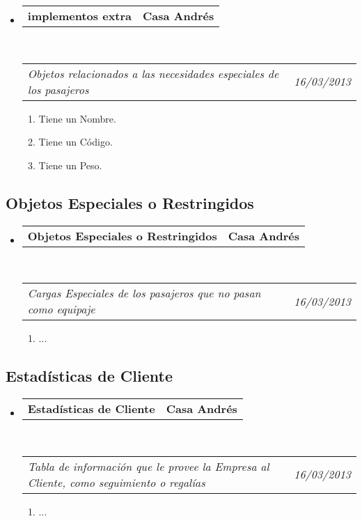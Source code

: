 \documentclass[10pt,letterpaper]{article}
\makeatletter
\newcommand{\headerrow}[2]
{\begin{tabular*}{\linewidth}{l@{\extracolsep{\fill}}r}
	#1 &
	#2 \\
\end{tabular*}}
\makeatother
\begin{document}
\begin{itemize}
	\parskip=0.1em

	\item
	\headerrow
		{\textbf{implementos extra}}
		{\textbf{Casa Andrés}}
	\\
	\headerrow
		{\emph{Objetos relacionados a las necesidades especiales de los pasajeros}}
		{\emph{16/03/2013}}
	\begin{enumerate}
		\item Tiene un Nombre.
		\item Tiene un Código.
		\item Tiene un Peso.
		
	\end{enumerate}

\end{itemize}


\subsection*{Objetos Especiales o Restringidos}

\begin{itemize}
	\parskip=0.1em

	\item
	\headerrow
		{\textbf{Objetos Especiales o Restringidos}}
		{\textbf{Casa Andrés}}
	\\
	\headerrow
		{\emph{Cargas Especiales de los pasajeros que no pasan como equipaje}}
		{\emph{16/03/2013}}
	\begin{enumerate}
		\item ...
	\end{enumerate}

\end{itemize}

\subsection*{Estadísticas de Cliente}

\begin{itemize}
	\parskip=0.1em

	\item
	\headerrow
		{\textbf{Estadísticas de Cliente}}
		{\textbf{Casa Andrés}}
	\\
	\headerrow
		{\emph{Tabla de información que le provee la Empresa al Cliente, como seguimiento o regalías}}
		{\emph{16/03/2013}}
	\begin{enumerate}
		\item ...
	\end{enumerate}

\end{itemize}
\end{document}
